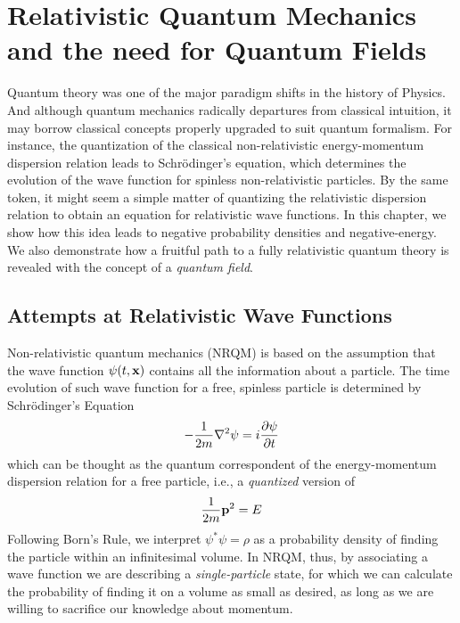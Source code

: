 \chapter{Relativistic Quantum Mechanics and the need for Quantum Fields}

Quantum theory was one of the major paradigm shifts in the history of Physics. And although quantum mechanics radically departures from classical intuition, it may borrow classical concepts properly upgraded to suit quantum formalism. For instance, the quantization of the classical non-relativistic energy-momentum dispersion relation leads to Schrödinger's equation, which determines the evolution of the wave function for spinless non-relativistic particles. By the same token, it might seem a simple matter of quantizing the relativistic dispersion relation to obtain an equation for relativistic wave functions. In this chapter, we show how this idea leads to negative probability densities and negative-energy. We also demonstrate how a fruitful path to a fully relativistic quantum theory is revealed with the concept of a \textit{quantum field}.\\
\section{Attempts at Relativistic Wave Functions}
Non-relativistic quantum mechanics (NRQM) is based on the assumption that the wave function $\psi(t,\vb{x})$ contains all the information about a particle. The time evolution of such wave function for a free, spinless particle is determined by Schrödinger's Equation
\begin{equation}
    -\frac{1}{2m}\laplacian{\psi}=i\pdv{\psi}{t}(x,t)
\end{equation}
which can be thought as the quantum correspondent of the energy-momentum dispersion relation for a free particle, i.e., a \textit{quantized} version of 
\begin{equation}
    \frac{1}{2m}\vb{p}^2=E
\end{equation}
Following Born's Rule, we interpret $\psi^*\psi=\rho$ as a probability density of finding the particle within an infinitesimal volume. In NRQM, thus, by associating a wave function we are describing a \textit{single-particle} state, for which we can calculate the probability of finding it on a volume as small as desired, as long as we are willing to sacrifice our knowledge about momentum.\\

